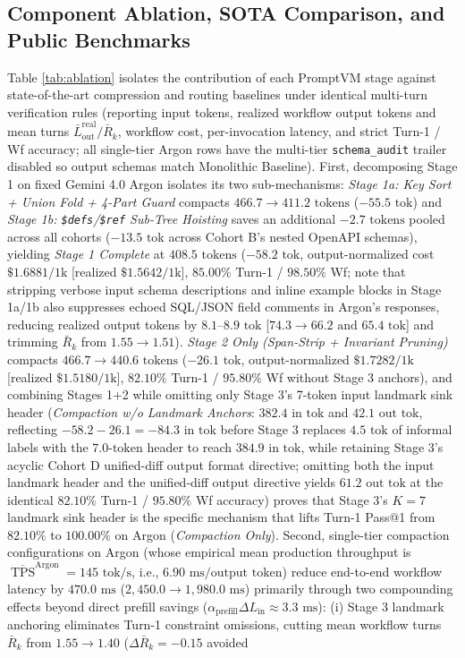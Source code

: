 \documentclass[conference,10pt]{IEEEtran}
\begin{document}
\subsection{Component Ablation, SOTA Comparison, and Public Benchmarks}
Table \ref{tab:ablation} isolates the contribution of each PromptVM stage against state-of-the-art compression and routing baselines under identical multi-turn verification rules (reporting input tokens, realized workflow output tokens and mean turns $\bar{L}_{\text{out}}^{\text{real}} / \bar{R}_k$, workflow cost, per-invocation latency, and strict Turn-1 / Wf accuracy; all single-tier Argon rows have the multi-tier \texttt{schema\_audit} trailer disabled so output schemas match Monolithic Baseline). First, decomposing Stage 1 on fixed Gemini 4.0 Argon isolates its two sub-mechanisms: \textit{Stage 1a: Key Sort + Union Fold + 4-Part Guard} compacts $466.7 \to 411.2\text{ tokens}$ ($-55.5\text{ tok}$) and \textit{Stage 1b: \texttt{\$defs}/\texttt{\$ref} Sub-Tree Hoisting} saves an additional $-2.7\text{ tokens}$ pooled across all cohorts ($-13.5\text{ tok}$ across Cohort B's nested OpenAPI schemas), yielding \textit{Stage 1 Complete} at $408.5\text{ tokens}$ ($-58.2\text{ tok}$, output-normalized cost $\$1.6881/\text{1k}$ [realized $\$1.5642/\text{1k}$], $85.00\%$ Turn-1 / $98.50\%$ Wf; note that stripping verbose input schema descriptions and inline example blocks in Stage 1a/1b also suppresses echoed SQL/JSON field comments in Argon's responses, reducing realized output tokens by $8.1\text{--}8.9\text{ tok}$ [$74.3 \to 66.2\text{ and }65.4\text{ tok}$] and trimming $\bar{R}_k$ from $1.55 \to 1.51$). \textit{Stage 2 Only (Span-Strip + Invariant Pruning)} compacts $466.7 \to 440.6\text{ tokens}$ ($-26.1\text{ tok}$, output-normalized $\$1.7282/\text{1k}$ [realized $\$1.5180/\text{1k}$], $82.10\%$ Turn-1 / $95.80\%$ Wf without Stage 3 anchors), and combining Stages 1+2 while omitting only Stage 3's 7-token input landmark sink header (\textit{Compaction w/o Landmark Anchors}: $382.4\text{ in tok}$ and $42.1\text{ out tok}$, reflecting $-58.2 - 26.1 = -84.3\text{ in tok}$ before Stage 3 replaces $4.5\text{ tok}$ of informal labels with the $7.0\text{-token}$ header to reach $384.9\text{ in tok}$, while retaining Stage 3's acyclic Cohort D unified-diff output format directive; omitting both the input landmark header and the unified-diff output directive yields $61.2\text{ out tok}$ at the identical $82.10\%$ Turn-1 / $95.80\%$ Wf accuracy) proves that Stage 3's $K=7$ landmark sink header is the specific mechanism that lifts Turn-1 Pass@1 from $82.10\%$ to $100.00\%$ on Argon (\textit{Compaction Only}). Second, single-tier compaction configurations on Argon (whose empirical mean production throughput is $\overline{\operatorname{TPS}}^{\text{Argon}} = 145\text{ tok/s}$, i.e., $6.90\text{ ms/output token}$) reduce end-to-end workflow latency by $470.0\text{ ms}$ ($2{,}450.0 \to 1{,}980.0\text{ ms}$) primarily through two compounding effects beyond direct prefill savings ($\alpha_{\text{prefill}} \Delta L_{\text{in}} \approx 3.3\text{ ms}$): (i) Stage 3 landmark anchoring eliminates Turn-1 constraint omissions, cutting mean workflow turns $\bar{R}_k$ from $1.55 \to 1.40$ ($\Delta \bar{R}_k = -0.15$ avoided 
\end{document}
